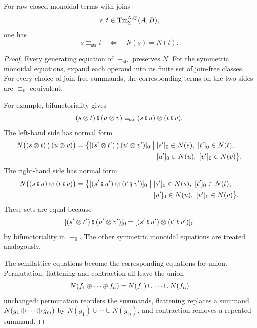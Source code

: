 \begin{lemma}
\label{lemma:lambda-term-normal-forms}
For raw closed-monoidal terms with joins
\[
  s,t\in
  \operatorname{Tm}^{\Lambda,\operatorname{\oplus}}_{\Sigma}(A,B),
\]
one has
\[
  s\equiv_{\mathsf{str}}t
  \quad\Longleftrightarrow\quad
  N(s)=N(t).
\]
\end{lemma}

\begin{proof}
Every generating equation of \(\equiv_{\mathsf{str}}\) preserves \(N\).
For the symmetric monoidal equations, expand each operand into its
finite set of join-free classes. For every choice of join-free
summands, the corresponding terms on the two sides are
\(\equiv_0\)-equivalent.

For example, bifunctoriality gives
\[
  (s\otimes t)\fatsemi(u\otimes v)
  \equiv_{\mathsf{str}}
  (s\fatsemi u)\otimes(t\fatsemi v).
\]
The left-hand side has normal form
\[
\begin{aligned}
  N\bigl((s\otimes t)\fatsemi(u\otimes v)\bigr)
  =
  \bigl\{
    [(s'\otimes t')\fatsemi(u'\otimes v')]_0
    \mathrel{\big|}
    {}&
    [s']_0\in N(s),\
    [t']_0\in N(t),\\
    &
    [u']_0\in N(u),\
    [v']_0\in N(v)
  \bigr\}.
\end{aligned}
\]
The right-hand side has normal form
\[
\begin{aligned}
  N\bigl((s\fatsemi u)\otimes(t\fatsemi v)\bigr)
  =
  \bigl\{
    [(s'\fatsemi u')\otimes(t'\fatsemi v')]_0
    \mathrel{\big|}
    {}&
    [s']_0\in N(s),\
    [t']_0\in N(t),\\
    &
    [u']_0\in N(u),\
    [v']_0\in N(v)
  \bigr\}.
\end{aligned}
\]
These sets are equal because
\[
  [(s'\otimes t')\fatsemi(u'\otimes v')]_0
  =
  [(s'\fatsemi u')\otimes(t'\fatsemi v')]_0
\]
by bifunctoriality in \(\equiv_0\). The other symmetric monoidal
equations are treated analogously.

The semilattice equations become the corresponding equations for
union. Permutation, flattening and contraction all leave the union
\[
  N(f_1\operatorname{\oplus}\cdots\operatorname{\oplus} f_n)
  =
  N(f_1)\cup\cdots\cup N(f_n)
\]
unchanged: permutation reorders the summands, flattening replaces a
summand $N(g_1\operatorname{\oplus}\cdots\operatorname{\oplus} g_m)$ by $N(g_1)\cup\cdots\cup N(g_m)$,
and contraction removes a repeated summand.


\end{proof}
